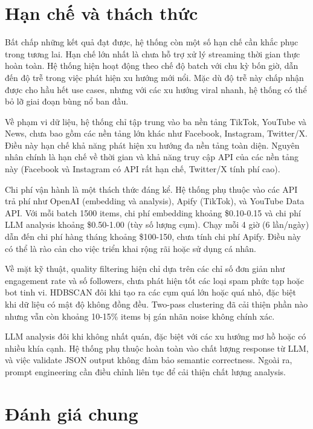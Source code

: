 \section{Hạn chế và thách thức}

Bất chấp những kết quả đạt được, hệ thống còn một số hạn chế cần khắc phục trong tương lai. Hạn chế lớn nhất là chưa hỗ trợ xử lý streaming thời gian thực hoàn toàn. Hệ thống hiện hoạt động theo chế độ batch với chu kỳ bốn giờ, dẫn đến độ trễ trong việc phát hiện xu hướng mới nổi. Mặc dù độ trễ này chấp nhận được cho hầu hết use cases, nhưng với các xu hướng viral nhanh, hệ thống có thể bỏ lỡ giai đoạn bùng nổ ban đầu.

Về phạm vi dữ liệu, hệ thống chỉ tập trung vào ba nền tảng TikTok, YouTube và News, chưa bao gồm các nền tảng lớn khác như Facebook, Instagram, Twitter/X. Điều này hạn chế khả năng phát hiện xu hướng đa nền tảng toàn diện. Nguyên nhân chính là hạn chế về thời gian và khả năng truy cập API của các nền tảng này (Facebook và Instagram có API rất hạn chế, Twitter/X tính phí cao).

Chi phí vận hành là một thách thức đáng kể. Hệ thống phụ thuộc vào các API trả phí như OpenAI (embedding và analysis), Apify (TikTok), và YouTube Data API. Với mỗi batch 1500 items, chi phí embedding khoảng \$0.10-0.15 và chi phí LLM analysis khoảng \$0.50-1.00 (tùy số lượng cụm). Chạy mỗi 4 giờ (6 lần/ngày) dẫn đến chi phí hàng tháng khoảng \$100-150, chưa tính chi phí Apify. Điều này có thể là rào cản cho việc triển khai rộng rãi hoặc sử dụng cá nhân.

Về mặt kỹ thuật, quality filtering hiện chỉ dựa trên các chỉ số đơn giản như engagement rate và số followers, chưa phát hiện tốt các loại spam phức tạp hoặc bot tinh vi. HDBSCAN đôi khi tạo ra các cụm quá lớn hoặc quá nhỏ, đặc biệt khi dữ liệu có mật độ không đồng đều. Two-pass clustering đã cải thiện phần nào nhưng vẫn còn khoảng 10-15\% items bị gán nhãn noise không chính xác.

LLM analysis đôi khi không nhất quán, đặc biệt với các xu hướng mơ hồ hoặc có nhiều khía cạnh. Hệ thống phụ thuộc hoàn toàn vào chất lượng response từ LLM, và việc validate JSON output không đảm bảo semantic correctness. Ngoài ra, prompt engineering cần điều chỉnh liên tục để cải thiện chất lượng analysis.

\section{Đánh giá chung}

